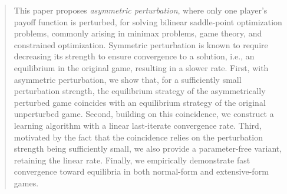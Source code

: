 \documentclass{article}
\theoremstyle{plain}
\begin{document}



\printAffiliationsAndNotice{}  %

\begin{abstract}
This paper proposes \textit{asymmetric perturbation}, where only one player's payoff function is perturbed, for solving bilinear saddle-point optimization problems, commonly arising in minimax problems, game theory, and constrained optimization. 
Symmetric perturbation is known to require decreasing its strength to ensure convergence to a solution, i.e., an equilibrium in the original game, resulting in a slower rate.
First, with asymmetric perturbation, we show that, for a sufficiently small perturbation strength, the equilibrium strategy of the asymmetrically perturbed game coincides with an equilibrium strategy of the original unperturbed game.
Second, building on this coincidence, we construct a learning algorithm with a linear last-iterate convergence rate. 
Third, motivated by the fact that the coincidence relies on the perturbation strength being sufficiently small, we also provide a parameter-free variant, retaining the linear rate. 
Finally, we empirically demonstrate fast convergence toward equilibria in both normal-form and extensive-form games.
\end{abstract}
\end{document}
